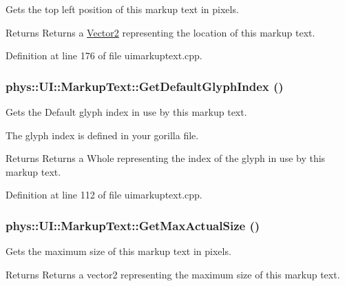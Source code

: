 Gets the top left position of this markup text in pixels. 

\begin{DoxyReturn}{Returns}
Returns a \hyperlink{classphys_1_1Vector2}{Vector2} representing the location of this markup text. 
\end{DoxyReturn}


Definition at line 176 of file uimarkuptext.cpp.

\hypertarget{classphys_1_1UI_1_1MarkupText_a02872d0b9828b34e9b2ceec82cce237b}{
\subsubsection[{GetDefaultGlyphIndex}]{ phys::UI::MarkupText::GetDefaultGlyphIndex ()}}
\label{d7/d23/classphys_1_1UI_1_1MarkupText_a02872d0b9828b34e9b2ceec82cce237b}


Gets the Default glyph index in use by this markup text. 

The glyph index is defined in your gorilla file. \begin{DoxyReturn}{Returns}
Returns a Whole representing the index of the glyph in use by this markup text. 
\end{DoxyReturn}


Definition at line 112 of file uimarkuptext.cpp.

\hypertarget{classphys_1_1UI_1_1MarkupText_a4a742f4d64038ded68c5480f4cf3e017}{
\subsubsection[{GetMaxActualSize}]{ phys::UI::MarkupText::GetMaxActualSize ()}}
\label{d7/d23/classphys_1_1UI_1_1MarkupText_a4a742f4d64038ded68c5480f4cf3e017}


Gets the maximum size of this markup text in pixels. 

\begin{DoxyReturn}{Returns}
Returns a vector2 representing the maximum size of this markup text. 
\end{DoxyReturn}


